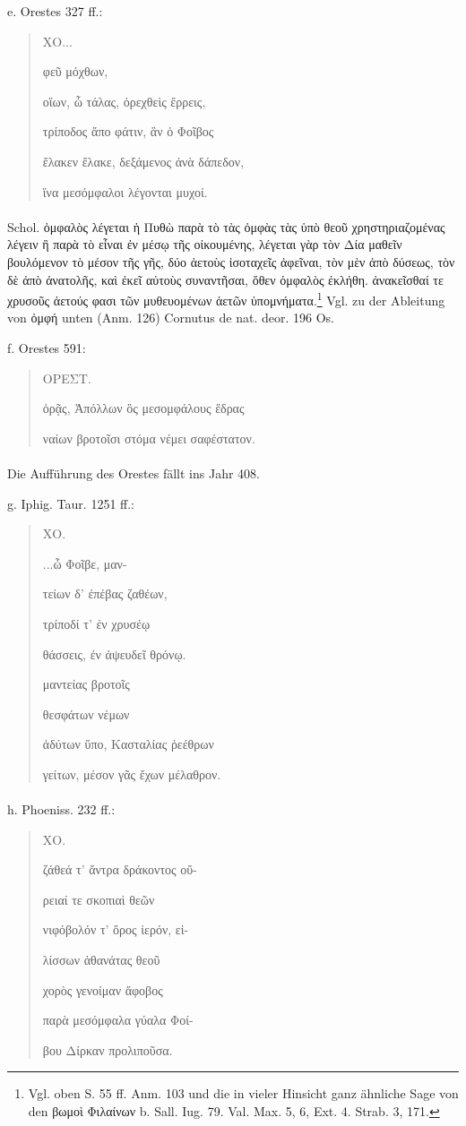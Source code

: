 \documentclass[a4paper, 11pt, oneside]{article}
\begin{document}
e. Orestes 327 ff.:
\begin{quotation}
ΧΟ...

φεῦ μόχθων,

οἵων, ὦ τάλας, ὀρεχθεὶς ἔρρεις,

τρίποδος ἄπο φάτιν, ἃν ὁ Φοῖβος

ἔλακεν ἔλακε, δεξάμενος ἀνὰ δάπεδον,

ἵνα μεσόμφαλοι λέγονται μυχοί.
\end{quotation}
\paragraph{}
Schol. ὀμφαλὸς λέγεται ἡ Πυθὼ παρὰ τὸ τὰς ὀμφὰς τὰς ὑπὸ θεοῦ χρηστηριαζομένας λέγειν ἢ παρὰ τὸ εἶναι ἐν μέσῳ τῆς οἰκουμένης, λέγεται γὰρ τὸν Δία μαθεῖν βουλόμενον τὸ μέσον τῆς γῆς, δύο ἀετοὺς ἰσοταχεῖς ἀφεῖναι, τὸν μὲν ἀπὸ δύσεως, τὸν δὲ ἀπὸ ἀνατολῆς, καὶ ἐκεῖ αὐτοὺς συναντῆσαι, ὅθεν ὀμφαλὸς ἐκλήθη. ἀνακεῖσθαί τε χρυσοῦς ἀετούς φασι τῶν μυθευομένων ἀετῶν ὑπομνήματα.\footnote{Vgl. oben S. 55 ff. Anm. 103 und die in vieler Hinsicht ganz ähnliche Sage von den βωμοὶ Φιλαίνων b. Sall. Iug. 79. Val. Max. 5, 6, Ext. 4. Strab. 3, 171.} Vgl. zu der Ableitung von ὀμφή unten (Anm. 126) Cornutus de nat. deor. 196 Os.

f. Orestes 591:
\begin{quotation}
ΟΡΕΣΤ.

ὁρᾷς, Ἀπόλλων ὃς μεσομφάλους ἕδρας

ναίων βροτοῖσι στόμα νέμει σαφέστατον.
\end{quotation}
\paragraph{}
Die Aufführung des Orestes fällt ins Jahr 408.

g. Iphig. Taur. 1251 ff.:
\begin{quotation}
ΧΟ.

...ὦ Φοῖβε, μαν-

τείων δ' ἐπέβας ζαθέων,

τρίποδί τ' ἐν χρυσέῳ

θάσσεις, ἐν ἀψευδεῖ θρόνῳ.

μαντείας βροτοῖς

θεσφάτων νέμων

ἀδύτων ὕπο, Κασταλίας ῥεέθρων

γείτων, μέσον γᾶς ἔχων μέλαθρον.
\end{quotation}
\paragraph{}
h. Phoeniss. 232 ff.:
\begin{quotation}
ΧΟ.

ζάθεά τ' ἄντρα δράκοντος οὔ-

ρειαί τε σκοπιαὶ θεῶν

νιφόβολόν τ' ὄρος ἱερόν, εἱ-

λίσσων ἀθανάτας θεοῦ

χορὸς γενοίμαν ἄφοβος

παρὰ μεσόμφαλα γύαλα Φοί-

βου Δίρκαν προλιποῦσα.
\end{quotation}
\end{document}

